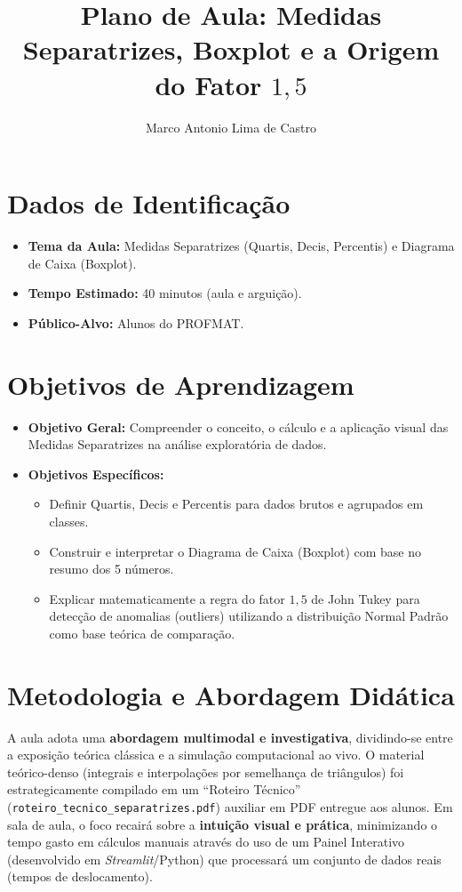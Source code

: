 \documentclass[12pt,a4paper]{article}
\title{\vspace{-2cm}\textbf{Plano de Aula: Medidas Separatrizes, Boxplot e a Origem do Fator $1,5$}}
\author{Marco Antonio Lima de Castro}
\date{}
\begin{document}
\maketitle

\section{Dados de Identificação}
\begin{itemize}
    \item \textbf{Tema da Aula:} Medidas Separatrizes (Quartis, Decis, Percentis) e Diagrama de Caixa (Boxplot).
    \item \textbf{Tempo Estimado:} 40 minutos (aula e arguição).
    \item \textbf{Público-Alvo:} Alunos do PROFMAT.
\end{itemize}

\section{Objetivos de Aprendizagem}
\begin{itemize}
    \item \textbf{Objetivo Geral:} Compreender o conceito, o cálculo e a aplicação visual das Medidas Separatrizes na análise exploratória de dados.
    \item \textbf{Objetivos Específicos:}
    \begin{itemize}
        \item Definir Quartis, Decis e Percentis para dados brutos e agrupados em classes.
        \item Construir e interpretar o Diagrama de Caixa (Boxplot) com base no resumo dos 5 números.
        \item Explicar matematicamente a regra do fator $1,5$ de John Tukey para detecção de anomalias (outliers) utilizando a distribuição Normal Padrão como base teórica de comparação.
    \end{itemize}
\end{itemize}

\section{Metodologia e Abordagem Didática}
A aula adota uma \textbf{abordagem multimodal e investigativa}, dividindo-se entre a exposição teórica clássica e a simulação computacional ao vivo.
O material teórico-denso (integrais e interpolações por semelhança de triângulos) foi estrategicamente compilado em um ``Roteiro Técnico'' (\texttt{roteiro\_tecnico\_separatrizes.pdf}) auxiliar em PDF entregue aos alunos. Em sala de aula, o foco recairá sobre a \textbf{intuição visual e prática}, minimizando o tempo gasto em cálculos manuais através do uso de um Painel Interativo (desenvolvido em \textit{Streamlit}/Python) que processará um conjunto de dados reais (tempos de deslocamento).
\end{document}
